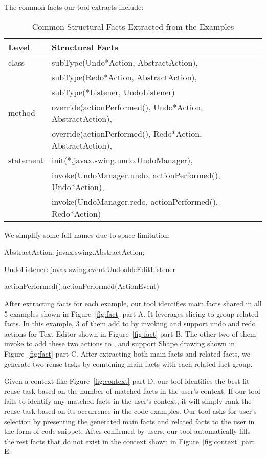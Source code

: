 The common facts our tool extracts include: 
\begin{table}[ht]
\begin{center}
\caption{Common Structural Facts Extracted from the Examples }
\label{tab:total}
\vspace{1mm}
\scriptsize{
\begin{tabular*}{0.5\textwidth}{@{}l|l@{}} \hline
Level&Structural Facts\\\hline
class&subType(Undo*Action, AbstractAction), \\ 
&subType(Redo*Action, AbstractAction), \\
&subType(*Listener, UndoListener)\\ \hline
method&override(actionPerformed(), Undo*Action, AbstractAction), \\
&override(actionPerformed(), Redo*Action, AbstractAction), \\ \hline
statement&init(*,javax.swing.undo.UndoManager), \\
&invoke(UndoManager.undo, actionPerformed(), Undo*Action),\\
& invoke(UndoManager.redo, actionPerformed(), Redo*Action)\\  \hline
\end{tabular*}
 \label{tab:dataset}

We simplify some full names due to space limitation: 

AbstractAction: javax.swing.AbstractAction;

UndoListener: javax.swing.event.UndoableEditListener

actionPerformed():actionPerformed(ActionEvent)
}
 \end{center}
\end{table}



 After extracting facts for each example, our tool identifies main facts shared in all 5 examples shown in Figure~\ref{fig:fact} part A. It leverages slicing to group related facts. In this example, 3 of them add  to  by invoking  and support undo and redo actions for Text Editor shown in Figure~\ref{fig:fact} part B. The other two of them invoke  to add these two actions to , and support  Shape drawing shown in Figure~\ref{fig:fact} part C. After extracting both main facts and related facts, we generate two reuse tasks by combining main facts with each related fact group.  

 Given a context like Figure~\ref{fig:context} part D, our tool identifies the best-fit reuse task based on the number of matched facts in the user's context.  If our tool fails to identify any matched facts in the user's context, it will simply rank the reuse task based on its occurrence in the code examples. Our tool asks for user's selection by presenting the generated main facts and related facts to the user in the form of code snippet. 
After confirmed by users, our tool automatically fills the rest facts that do not exist in the context shown in Figure~\ref{fig:context} part E. 


